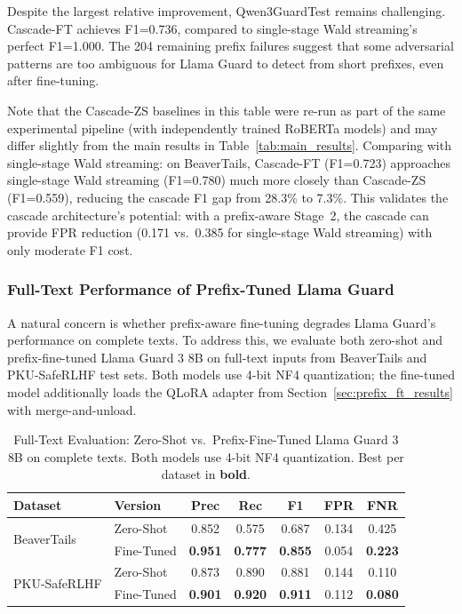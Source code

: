 \documentclass[acmtjournal, acmnowidth]{acmart}
\theoremstyle{definition}
\begin{document}
Despite the largest relative improvement, Qwen3GuardTest remains challenging. Cascade-FT achieves F1=0.736, compared to single-stage Wald streaming's perfect F1=1.000. The 204 remaining prefix failures suggest that some adversarial patterns are too ambiguous for Llama Guard to detect from short prefixes, even after fine-tuning.

Note that the Cascade-ZS baselines in this table were re-run as part of the same experimental pipeline (with independently trained RoBERTa models) and may differ slightly from the main results in Table~\ref{tab:main_results}. Comparing with single-stage Wald streaming: on BeaverTails, Cascade-FT (F1=0.723) approaches single-stage Wald streaming (F1=0.780) much more closely than Cascade-ZS (F1=0.559), reducing the cascade F1 gap from 28.3\% to 7.3\%. This validates the cascade architecture's potential: with a prefix-aware Stage~2, the cascade can provide FPR reduction (0.171 vs.\ 0.385 for single-stage Wald streaming) with only moderate F1 cost.

\subsubsection{Full-Text Performance of Prefix-Tuned Llama Guard}
\label{sec:fulltext_ft}

A natural concern is whether prefix-aware fine-tuning degrades Llama Guard's performance on complete texts. To address this, we evaluate both zero-shot and prefix-fine-tuned Llama Guard 3 8B on full-text inputs from BeaverTails and PKU-SafeRLHF test sets. Both models use 4-bit NF4 quantization; the fine-tuned model additionally loads the QLoRA adapter from Section~\ref{sec:prefix_ft_results} with merge-and-unload.

\begin{table}[h]
\caption{Full-Text Evaluation: Zero-Shot vs.\ Prefix-Fine-Tuned Llama Guard 3 8B on complete texts. Both models use 4-bit NF4 quantization. Best per dataset in \textbf{bold}.}
\label{tab:fulltext_lg}
\small
\begin{tabular}{llccccc}
\toprule
Dataset & Version & Prec & Rec & F1 & FPR & FNR \\
\midrule
\multirow{2}{*}{BeaverTails}
 & Zero-Shot & 0.852 & 0.575 & 0.687 & 0.134 & 0.425 \\
 & Fine-Tuned & \textbf{0.951} & \textbf{0.777} & \textbf{0.855} & 0.054 & \textbf{0.223} \\
\midrule
\multirow{2}{*}{PKU-SafeRLHF}
 & Zero-Shot & 0.873 & 0.890 & 0.881 & 0.144 & 0.110 \\
 & Fine-Tuned & \textbf{0.901} & \textbf{0.920} & \textbf{0.911} & 0.112 & \textbf{0.080} \\
\bottomrule
\end{tabular}
\end{table}
\end{document}
